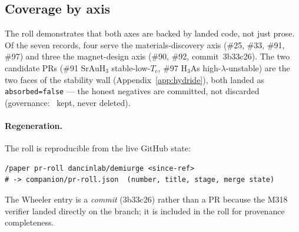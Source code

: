 \subsection{Coverage by axis}
\label{app:pr-coverage}

The roll demonstrates that both axes are backed by landed code, not just
prose. Of the seven records, four serve the materials-discovery axis
(\#25, \#33, \#91, \#97) and three the magnet-design axis (\#90, \#92,
commit~3b33c26). The two candidate PRs (\#91 SrAuH$_3$ stable-low-$T_c$,
\#97 H$_3$As high-$\lambda$-unstable) are the two faces of the stability
wall (Appendix~\ref{app:hydride}), both landed as
\texttt{absorbed=false} --- the honest negatives are committed, not
discarded (governance: \tierRed\ kept, never deleted).

\paragraph{Regeneration.} The roll is reproducible from the live GitHub
state:
\begin{lstlisting}
/paper pr-roll dancinlab/demiurge <since-ref>
# -> companion/pr-roll.json  (number, title, stage, merge state)
\end{lstlisting}
The Wheeler entry is a \emph{commit} (3b33c26) rather than a PR because the
M318 verifier landed directly on the branch; it is included in the roll for
provenance completeness.
